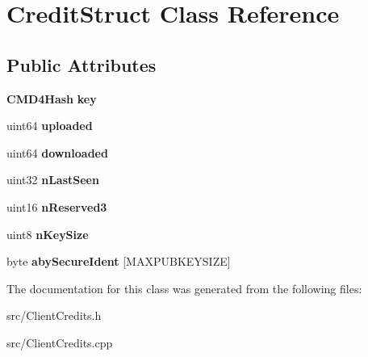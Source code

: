 \section{CreditStruct Class Reference}
\label{classCreditStruct}
\subsection*{Public Attributes}
\begin{DoxyCompactItemize}
\item 
{\bf CMD4Hash} {\bfseries key}\label{classCreditStruct_afa81494d3b643324a0428d9ab96b3b6a}

\item 
uint64 {\bfseries uploaded}\label{classCreditStruct_a5fe24d65835d3a6a6540a50fbebcba7e}

\item 
uint64 {\bfseries downloaded}\label{classCreditStruct_a3b3e418d0732448c5aa20db95c2b6189}

\item 
uint32 {\bfseries nLastSeen}\label{classCreditStruct_afb17f2c216c7b7d9cc89d39b4f49a02e}

\item 
uint16 {\bfseries nReserved3}\label{classCreditStruct_a2e333743581de3962c047c20e36b322c}

\item 
uint8 {\bfseries nKeySize}\label{classCreditStruct_a09cf407d2b04d5d5bff885ac126bc53b}

\item 
byte {\bfseries abySecureIdent} [MAXPUBKEYSIZE]\label{classCreditStruct_acbf8c5ccbd2fbbfcfd79dff69bdf5b74}

\end{DoxyCompactItemize}


The documentation for this class was generated from the following files:\begin{DoxyCompactItemize}
\item 
src/ClientCredits.h\item 
src/ClientCredits.cpp\end{DoxyCompactItemize}
